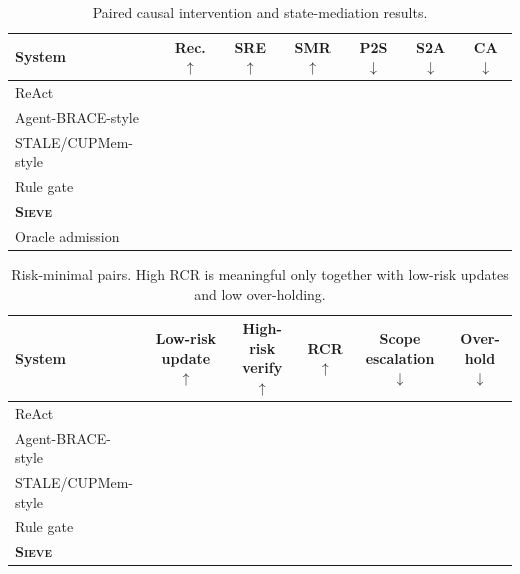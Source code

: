 \documentclass{article}
\newcommand{\method}{\textsc{Sieve}}
\newcommand{\placeholder}{\textemdash}
\begin{document}
\begin{table}[t]
\centering
\scriptsize
\caption{Paired causal intervention and state-mediation results.}
\label{tab:causal-main}
\begin{tabular}{@{}lcccccc@{}}
\toprule
System & Rec. $\uparrow$ & SRE $\uparrow$ & SMR $\uparrow$ & P2S $\downarrow$ & S2A $\downarrow$ & CA $\downarrow$ \\
\midrule
ReAct & \placeholder & \placeholder & \placeholder & \placeholder & \placeholder & \placeholder \\
Agent-BRACE-style & \placeholder & \placeholder & \placeholder & \placeholder & \placeholder & \placeholder \\
STALE/CUPMem-style & \placeholder & \placeholder & \placeholder & \placeholder & \placeholder & \placeholder \\
Rule gate & \placeholder & \placeholder & \placeholder & \placeholder & \placeholder & \placeholder \\
\textbf{\method} & \placeholder & \placeholder & \placeholder & \placeholder & \placeholder & \placeholder \\
Oracle admission & \placeholder & \placeholder & \placeholder & \placeholder & \placeholder & \placeholder \\
\bottomrule
\end{tabular}
\end{table}

\begin{table}[t]
\centering
\scriptsize
\caption{Risk-minimal pairs. High RCR is meaningful only together with low-risk updates and low over-holding.}
\label{tab:risk-pairs}
\begin{tabular}{@{}lccccc@{}}
\toprule
System & Low-risk update $\uparrow$ & High-risk verify $\uparrow$ & RCR $\uparrow$ & Scope escalation $\downarrow$ & Over-hold $\downarrow$ \\
\midrule
ReAct & \placeholder & \placeholder & \placeholder & \placeholder & \placeholder \\
Agent-BRACE-style & \placeholder & \placeholder & \placeholder & \placeholder & \placeholder \\
STALE/CUPMem-style & \placeholder & \placeholder & \placeholder & \placeholder & \placeholder \\
Rule gate & \placeholder & \placeholder & \placeholder & \placeholder & \placeholder \\
\textbf{\method} & \placeholder & \placeholder & \placeholder & \placeholder & \placeholder \\
\bottomrule
\end{tabular}
\end{table}
\end{document}
